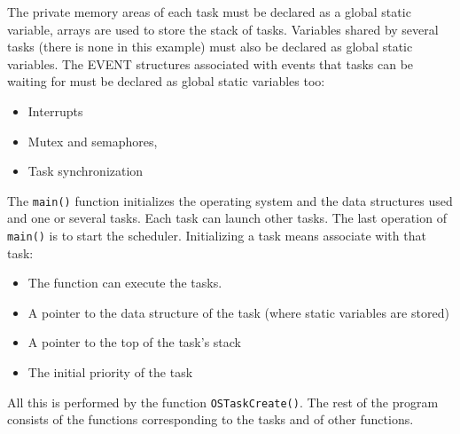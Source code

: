 \documentclass[../main.tex]{subfiles}
\begin{document}

The private memory areas of each task must be declared as a global static variable, arrays are used to store the stack of tasks.
Variables shared by several tasks (there is none in this example) must also be declared as global static variables.
The EVENT structures associated with events that tasks can be waiting for must be declared as global static variables too:
\begin{itemize}
	\item Interrupts
	\item Mutex and semaphores,
	\item Task synchronization
\end{itemize}
The \texttt{main()} function initializes the operating system and the data structures used and one or several tasks. Each task can launch other tasks. The last operation of \texttt{main()} is to start the scheduler. Initializing a task means associate with that task:
\begin{itemize}
	\item The function can execute the tasks.
	\item A pointer to the data structure of the task (where static variables are stored)
	\item A pointer to the top of the task's stack
	\item The initial priority of the task
\end{itemize}
All this is performed by the function \texttt{OSTaskCreate()}. The rest of the program consists of the functions corresponding to the tasks and of other functions.
\end{document}

